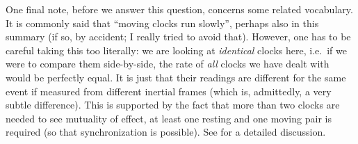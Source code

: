 \documentclass[../relativity_main.tex]{subfiles}
\begin{document}


%	
%	
%	




One final note, before we answer this question, concerns some related vocabulary. It is commonly said that \enquote{moving clocks run slowly}, perhaps also in this summary (if so, by accident; I really tried to avoid that). However, one has to be careful taking this too literally: we are looking at \emph{identical} clocks here, i.e.~if we were to compare them side-by-side, the rate of \emph{all} clocks we have dealt with would be perfectly equal. It is just that their readings are different for the same event if measured from different inertial frames (which is, admittedly, a very subtle difference). This is supported by the fact that more than two clocks are needed to see mutuality of effect, at least one resting and one moving pair is required (so that synchronization is possible). See \cite{giulini_srt} for a detailed discussion.




\end{document}
